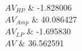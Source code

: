 $AV_{HP}$	&	-1.828006\\\hline
$AV_{Amp}$	&	40.086427\\\hline
$AV_{LP}$	&	-1.695830\\\hline
$AV$	&	36.562591\\\hline
